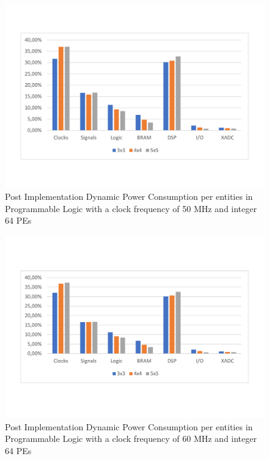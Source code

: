 \begin{itemize}
\begin{figure}[!htbp]
\label{fig:dynpowint64ent30}
\end{figure}
\begin{figure}[!htbp]
\centering
\captionsetup{justification=centering}
\includegraphics[scale=0.6,angle=0]{./figure/graphs/power_pldyn_div_int64_freq_50mhz.pdf}
\caption{Post Implementation Dynamic Power Consumption per entities in Programmable Logic with a clock frequency of 50 MHz and integer 64 PEs}
\label{fig:dynpowint64ent50}
\end{figure}
\begin{figure}[!htbp]
\centering
\captionsetup{justification=centering}
\includegraphics[scale=0.6,angle=0]{./figure/graphs/power_pldyn_div_int64_freq_60mhz.pdf}
\caption{Post Implementation Dynamic Power Consumption per entities in Programmable Logic with a clock frequency of 60 MHz and integer 64 PEs}
\label{fig:dynpowint64ent60}
\end{figure}


\end{itemize}
